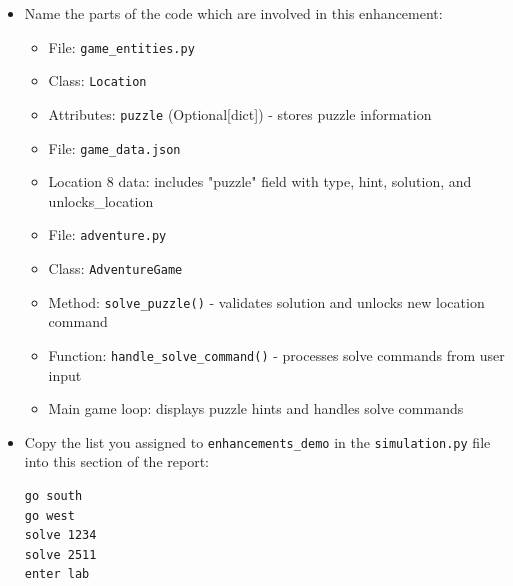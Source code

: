 \documentclass[11pt]{article}
\begin{document}
\begin{enumerate}
\begin{itemize}
        \item Name the parts of the code which are involved in this enhancement:
        \begin{itemize}
            \item File: \texttt{game\_entities.py}
            \item Class: \texttt{Location}
            \item Attributes: \texttt{puzzle} (Optional[dict]) - stores puzzle information
            \item File: \texttt{game\_data.json}
            \item Location 8 data: includes "puzzle" field with type, hint, solution, and unlocks\_location
            \item File: \texttt{adventure.py}
            \item Class: \texttt{AdventureGame}
            \item Method: \texttt{solve\_puzzle()} - validates solution and unlocks new location command
            \item Function: \texttt{handle\_solve\_command()} - processes solve commands from user input
            \item Main game loop: displays puzzle hints and handles solve commands
        \end{itemize}
        
        \item Copy the list you assigned to \texttt{enhancements\_demo} in the \texttt{simulation.py} file into this section of the report:
        \begin{verbatim}
go south
go west
solve 1234
solve 2511
enter lab
        \end{verbatim}
    \end{itemize}
\end{enumerate}
\end{document}
